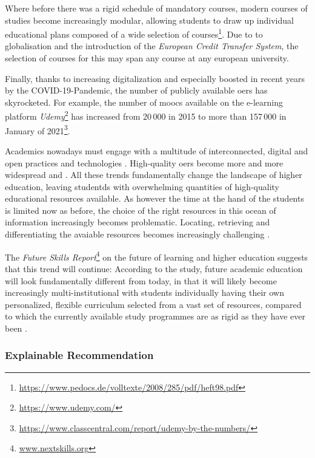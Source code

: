 Where before there was a rigid schedule of mandatory courses, modern courses of studies become increasingly modular, allowing students to draw up individual educational plans composed of a wide selection of courses\footnote{\url{https://www.pedocs.de/volltexte/2008/285/pdf/heft98.pdf}}. Due to to globalisation and the introduction of the \emph{European Credit Transfer System}, the selection of courses for this may span any course at any european university.

Finally, thanks to increasing digitalization and especially boosted in recent years by the COVID-19-Pandemic, the number of publicly available \glspl{oer} has skyrocketed. For example, the number of \glspl{mooc} available on the e-learning platform \textit{Udemy}\footnote{\url{https://www.udemy.com/}} has increased from 20\,000 in 2015 to more than 157\,000 in January of 2021\footnote{\url{https://www.classcentral.com/report/udemy-by-the-numbers/}}.

Academics nowadays must engage with a multitude of interconnected, digital and open practices and technologies \cite{Atenas2014}. High-quality \glspl{oer} become more and more widespread and  \cite[2]{Olcott2012}. All these trends fundamentally change the landscape of higher education, leaving studentds with overwhelming quantities of high-quality educational resources available. As however the time at the hand of the students is limited now as before, the choice of the right resources in this ocean of information increasingly becomes problematic. Locating, retrieving and differentiating the avaiable resources becomes increasingly challenging \cite{Atenas2014}.

The \emph{Future Skills Report}\footnote{\url{www.nextskills.org}} on the future of learning and higher education \cite{Ehlers2019} suggests that this trend will continue: According to the study, future academic education will look fundamentally different from today, in that it will likely become increasingly multi-institutional with students individually having their own personalized, flexible curriculum selected from a vast set of resources, compared to which the currently available study programmes are as rigid as they have ever been \cite{Ehlers2019}.

\subsubsection*{Explainable Recommendation}

